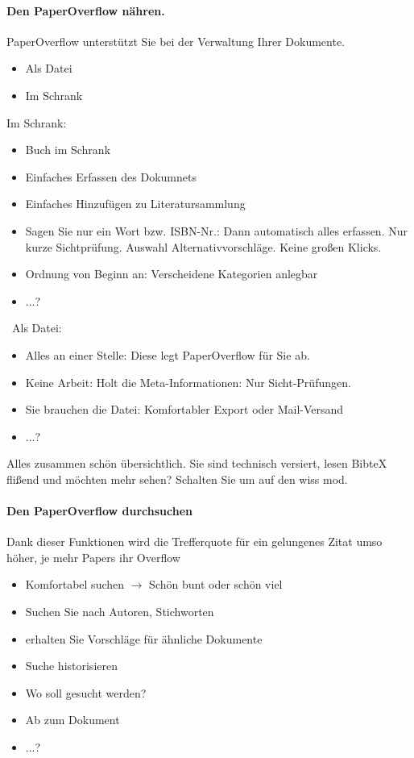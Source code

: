 \documentclass[a4paper,12pt]{article}
\begin{document}
\paragraph{Den PaperOverflow nähren.}
PaperOverflow unterstützt Sie bei der Verwaltung Ihrer Dokumente. 
\begin{itemize}
	\item Als Datei
	\item Im Schrank
\end{itemize}
Im Schrank:
\begin{itemize}
	\item Buch im Schrank
	\item Einfaches Erfassen des Dokumnets
	\item Einfaches Hinzufügen zu Literatursammlung
	\item Sagen Sie nur ein Wort bzw. ISBN-Nr.: Dann automatisch alles erfassen. Nur kurze Sichtprüfung. Auswahl Alternativvorschläge. Keine großen Klicks.
	\item Ordnung von Beginn an: Verscheidene Kategorien anlegbar 
	\item ...?
\end{itemize}
\
Als Datei:
\begin{itemize}
	\item Alles an einer Stelle: Diese legt PaperOverflow für Sie ab.
	\item Keine Arbeit:  Holt die Meta-Informationen: Nur Sicht-Prüfungen.
	\item Sie brauchen die Datei: Komfortabler Export oder Mail-Versand
	\item ...?
\end{itemize}
Alles zusammen schön übersichtlich.
Sie sind technisch versiert, lesen BibteX flißend und möchten mehr sehen? Schalten Sie um auf den wiss mod.


\paragraph{Den PaperOverflow durchsuchen}
Dank dieser Funktionen wird die Trefferquote für ein gelungenes Zitat umso höher, je mehr Papers ihr Overflow 
\begin{itemize}
	\item Komfortabel suchen $\to$ Schön bunt oder schön viel
	\item Suchen Sie nach Autoren, Stichworten 
	\item erhalten Sie Vorschläge für ähnliche Dokumente
	\item Suche historisieren
	\item Wo soll gesucht werden?
	\item Ab zum Dokument
	\item ...?	
\end{itemize}
\end{document}
